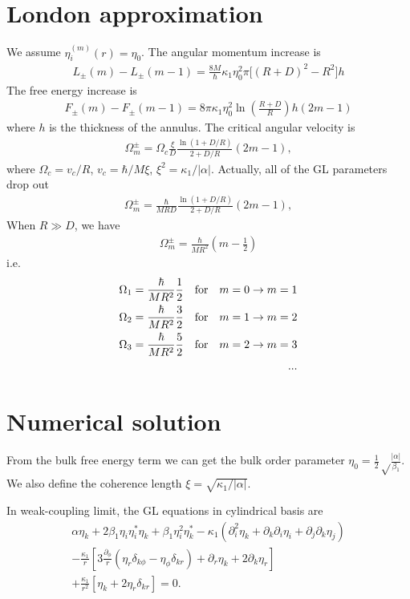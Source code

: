 \documentclass[aps,prl,preprint]{revtex4-2}
\begin{document}
\section{London approximation}
We assume $\eta_i^{(m)}(r) = \eta_0$.
The angular momentum increase is
\begin{align}
    L_\pm(m) - L_\pm(m-1)
    =\frac{8M}{\hbar}\kappa_1\eta_0^2\pi\bigg[(R+D)^2-R^2\bigg]h
\end{align}
The free energy increase is
\begin{align}
    F_\pm(m)-F_\pm(m-1)=8\pi\kappa_1\eta_0^2\ln(\frac{R+D}{R})h(2m-1)
\end{align}
where $h$ is the thickness of the annulus. The critical angular velocity is
\begin{align}
    \Omega_m^\pm=\Omega_c\frac{\xi}{D}\frac{\ln{(1+D/R)}}{2+D/R}(2m-1),
\end{align}
where $\Omega_c = v_c/R$, $v_c = \hbar/M\xi$, $\xi^2=\kappa_1/|\alpha|$.
Actually, all of the GL parameters drop out
\begin{align}
    \Omega_m^\pm=\frac{\hbar}{MRD}\frac{\ln{(1+D/R)}}{2+D/R}(2m-1),
\end{align}
When $R\gg D$, we have
\begin{align}
    \Omega_m^\pm=\frac{\hbar}{MR^2}\left(m-\frac{1}{2}\right)
\end{align}
i.e.
\begin{align}
    \Omega_1=\frac{\hbar}{MR^2}\frac{1}{2}\qq{for}m=0\rightarrow m=1 \\
    \Omega_2=\frac{\hbar}{MR^2}\frac{3}{2}\qq{for}m=1\rightarrow m=2 \\
    \Omega_3=\frac{\hbar}{MR^2}\frac{5}{2}\qq{for}m=2\rightarrow m=3 \\
    ...
\end{align}

\section{Numerical solution}

From the bulk free energy term we can get the bulk order parameter
$\eta_0 = \frac{1}{2}\sqrt\frac{|\alpha|}{\beta_1}$.
We also define the coherence length $\xi = \sqrt{\kappa_1/|\alpha|}$.

In weak-coupling limit, the GL equations in cylindrical basis are
\begin{align}
    \alpha\eta_k+2\beta_1\eta_i\eta_i^*\eta_k
    +\beta_1\eta_i^2\eta_k^*
    -\kappa_1\left(\partial_i^2\eta_k
    +\partial_k\partial_i\eta_i
    +\partial_j\partial_k\eta_j\right)\nonumber \\
    -\frac{\kappa_1}{r}\left[3\frac{\partial_\phi}{r}
        \left(\eta_r\delta_{k\phi}-\eta_\phi\delta_{kr}\right)+\partial_r\eta_k
    +2\partial_k\eta_r\right]\nonumber          \\
    +\frac{\kappa_1}{r^2}\left[\eta_k+2\eta_r\delta_{kr}\right]=0.
\end{align}
\end{document}
